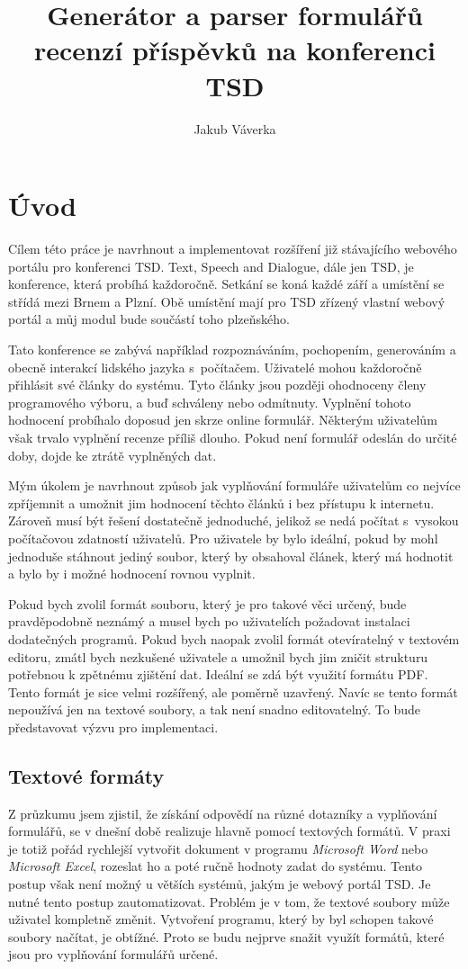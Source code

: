 \documentclass[czech,BP]{thesiskiv}
\author{Jakub Váverka}
\title{Generátor a parser formulářů recenzí příspěvků na konferenci TSD}
\begin{document}
%
\maketitle
\tableofcontents

\chapter{Úvod}
Cílem této práce je navrhnout a implementovat rozšíření již stávajícího webového portálu pro konferenci TSD. Text, Speech and Dialogue, dále jen TSD, je konference, která probíhá každoročně. Setkání se koná každé září a umístění se střídá mezi Brnem a Plzní. Obě umístění mají pro TSD zřízený vlastní webový portál a můj modul bude součástí toho plzeňského.

Tato konference se zabývá například rozpoznáváním, pochopením, generováním a obecně interakcí lidského jazyka s~počítačem. Uživatelé mohou každoročně přihlásit své články do systému. Tyto články jsou později ohodnoceny členy programového výboru, a buď schváleny nebo odmítnuty. Vyplnění tohoto hodnocení probíhalo doposud jen skrze online formulář. Některým uživatelům však trvalo vyplnění recenze příliš dlouho. Pokud není formulář odeslán do určité doby, dojde ke ztrátě vyplněných dat.

Mým úkolem je navrhnout způsob jak vyplňování formuláře uživatelům co nejvíce zpříjemnit a umožnit jim hodnocení těchto článků i bez přístupu k internetu. Zároveň musí být řešení dostatečně jednoduché, jelikož se nedá počítat s~vysokou počítačovou zdatností uživatelů. Pro uživatele by bylo ideální, pokud by mohl jednoduše stáhnout jediný soubor, který by obsahoval článek, který má hodnotit a bylo by i možné hodnocení rovnou vyplnit.

Pokud bych zvolil formát souboru, který je pro takové věci určený, bude pravděpodobně neznámý a musel bych po uživatelích požadovat instalaci dodatečných programů. Pokud bych naopak zvolil formát otevíratelný v textovém editoru, zmátl bych nezkušené uživatele a umožnil bych jim zničit strukturu potřebnou k zpětnému zjištění dat. Ideální se zdá být využití formátu PDF. Tento formát je sice velmi rozšířený, ale poměrně uzavřený. Navíc se tento formát nepoužívá jen na textové soubory, a tak není snadno editovatelný. To bude představovat výzvu pro implementaci.

\section{Textové formáty}
Z průzkumu jsem zjistil, že získání odpovědí na různé dotazníky a vyplňování formulářů, se v dnešní době realizuje hlavně pomocí textových formátů. V praxi je totiž pořád rychlejší vytvořit dokument v programu \emph{Microsoft Word} nebo \emph{Microsoft Excel}, rozeslat ho a poté ručně hodnoty zadat do systému. Tento postup však není možný u větších systémů, jakým je webový portál TSD. Je nutné tento postup zautomatizovat. Problém je v tom, že textové soubory může uživatel kompletně změnit. Vytvoření programu, který by byl schopen takové soubory načítat, je obtížné. Proto se budu nejprve snažit využít formátů, které jsou pro vyplňování formulářů určené. 
\end{document}

